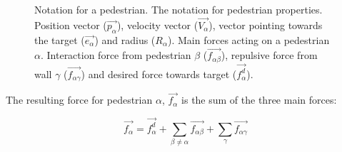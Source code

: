 \begin{figure}[ht]
    \centering
    \caption[Notation for pedestrians]{Notation for a pedestrian.  
     The notation for pedestrian properties. Position 
    vector ($ \overrightarrow{p_{\alpha}} $), velocity vector ($ 
    \overrightarrow{V_{\alpha}} $), vector pointing towards 
    the target ($\overrightarrow{e_{\alpha}}$)  and radius ($ R_{\alpha} $).
     Main forces acting on a pedestrian $\alpha$. 
    Interaction force from pedestrian $\beta$ 
    ($\overrightarrow{f_{\alpha\beta}}$), repulsive force from wall $\gamma$ 
    ($\overrightarrow{f_{\alpha \gamma}}$) and desired force towards target 
    ($\overrightarrow{f^{d}_{\alpha}}$).}

    \label{pedestrian-notation}
\end{figure}

The resulting force for pedestrian $\alpha$, $\overrightarrow{f_{\alpha}}$ is 
the sum of the three main forces:

\begin{equation}\label{model}
    \overrightarrow{f_{\alpha}} = \overrightarrow{f^{d}_{\alpha}} +
    \sum_{\beta \neq \alpha} \overrightarrow{f_{\alpha \beta}} +
    \sum_{\gamma} \overrightarrow{f_{\alpha \gamma}}
\end{equation}

